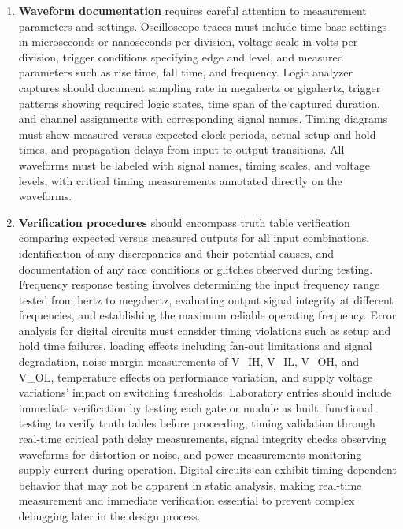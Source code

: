\documentclass[12pt]{article}
\begin{document}
\begin{enumerate}
\item \textbf{Waveform documentation} requires careful attention to measurement parameters and settings. Oscilloscope traces must include time base settings in microseconds or nanoseconds per division, voltage scale in volts per division, trigger conditions specifying edge and level, and measured parameters such as rise time, fall time, and frequency. Logic analyzer captures should document sampling rate in megahertz or gigahertz, trigger patterns showing required logic states, time span of the captured duration, and channel assignments with corresponding signal names. Timing diagrams must show measured versus expected clock periods, actual setup and hold times, and propagation delays from input to output transitions. All waveforms must be labeled with signal names, timing scales, and voltage levels, with critical timing measurements annotated directly on the waveforms.

\item \textbf{Verification procedures} should encompass truth table verification comparing expected versus measured outputs for all input combinations, identification of any discrepancies and their potential causes, and documentation of any race conditions or glitches observed during testing. Frequency response testing involves determining the input frequency range tested from hertz to megahertz, evaluating output signal integrity at different frequencies, and establishing the maximum reliable operating frequency. Error analysis for digital circuits must consider timing violations such as setup and hold time failures, loading effects including fan-out limitations and signal degradation, noise margin measurements of V\_IH, V\_IL, V\_OH, and V\_OL, temperature effects on performance variation, and supply voltage variations' impact on switching thresholds. Laboratory entries should include immediate verification by testing each gate or module as built, functional testing to verify truth tables before proceeding, timing validation through real-time critical path delay measurements, signal integrity checks observing waveforms for distortion or noise, and power measurements monitoring supply current during operation. Digital circuits can exhibit timing-dependent behavior that may not be apparent in static analysis, making real-time measurement and immediate verification essential to prevent complex debugging later in the design process.


\end{enumerate}
\end{document}
